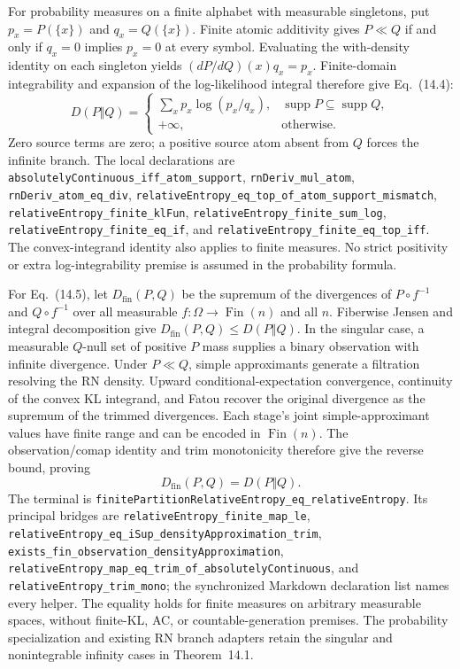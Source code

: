For probability measures on a finite alphabet with measurable singletons,
put $p_x=P(\{x\})$ and $q_x=Q(\{x\})$. Finite atomic additivity gives
$P\ll Q$ if and only if $q_x=0$ implies $p_x=0$ at every symbol.
Evaluating the with-density identity on each singleton yields
$(dP/dQ)(x)q_x=p_x$. Finite-domain integrability and expansion of the
log-likelihood integral therefore give Eq.~(14.4):
\[
D(P\Vert Q)=
\begin{cases}
\displaystyle\sum_x p_x\log(p_x/q_x),&\operatorname{supp}P\subseteq\operatorname{supp}Q,\\
+\infty,&\text{otherwise}.
\end{cases}
\]
Zero source terms are zero; a positive source atom absent from $Q$ forces
the infinite branch. The local declarations are
\texttt{absolutelyContinuous\_iff\_atom\_support},
\texttt{rnDeriv\_mul\_atom}, \texttt{rnDeriv\_atom\_eq\_div},
\texttt{relativeEntropy\_eq\_top\_of\_atom\_support\_mismatch},
\texttt{relativeEntropy\_finite\_klFun},
\texttt{relativeEntropy\_finite\_sum\_log},
\texttt{relativeEntropy\_finite\_eq\_if}, and
\texttt{relativeEntropy\_finite\_eq\_top\_iff}.
The convex-integrand identity also applies to finite measures.
No strict positivity or extra log-integrability premise is assumed in the
probability formula.

For Eq.~(14.5), let $D_{\mathrm{fin}}(P,Q)$ be the supremum of the
divergences of $P\circ f^{-1}$ and $Q\circ f^{-1}$ over all measurable
$f:\Omega\to\operatorname{Fin}(n)$ and all $n$. Fiberwise Jensen and integral
decomposition give $D_{\mathrm{fin}}(P,Q)\le D(P\Vert Q)$. In the singular
case, a measurable $Q$-null set of positive $P$ mass supplies a binary
observation with infinite divergence. Under $P\ll Q$, simple approximants
generate a filtration resolving the RN density. Upward conditional-expectation
convergence, continuity of the convex KL integrand, and Fatou recover the
original divergence as the supremum of the trimmed divergences. Each stage's
joint simple-approximant values have finite range and can be encoded in
$\operatorname{Fin}(n)$. The observation/comap identity and trim monotonicity
therefore give the reverse bound, proving
\[
 D_{\mathrm{fin}}(P,Q)=D(P\Vert Q).
\]
The terminal is \texttt{finitePartitionRelativeEntropy\_eq\_relativeEntropy}.
Its principal bridges are \texttt{relativeEntropy\_finite\_map\_le},
\texttt{relativeEntropy\_eq\_iSup\_densityApproximation\_trim},
\texttt{exists\_fin\_observation\_densityApproximation},
\texttt{relativeEntropy\_map\_eq\_trim\_of\_\allowbreak absolutelyContinuous}, and
\texttt{relativeEntropy\_trim\_mono}; the synchronized Markdown declaration
list names every helper. The equality holds for finite measures on arbitrary
measurable spaces, without finite-KL, AC, or countable-generation premises.
The probability specialization and existing RN branch adapters retain the
singular and nonintegrable infinity cases in Theorem~14.1.

